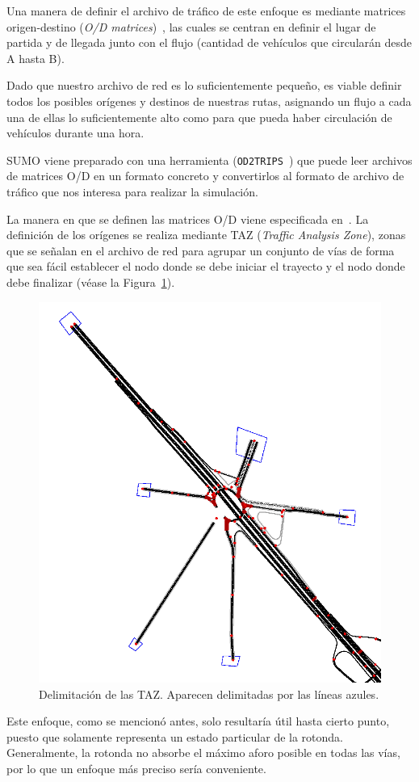 Una manera de definir el archivo de tráfico de este enfoque es mediante matrices origen-destino (\textit{O/D matrices})~\cite{otto_anker_nielsen_two_1998}, las cuales se centran en definir el lugar de partida y de llegada junto con el flujo (cantidad de vehículos que circularán desde A hasta B).

Dado que nuestro archivo de red es lo suficientemente pequeño, es viable definir todos los posibles orígenes y destinos de nuestras rutas, asignando un flujo a cada una de ellas lo suficientemente alto como para que pueda haber circulación de vehículos durante una hora.

SUMO viene preparado con una herramienta (\texttt{OD2TRIPS}~\cite{noauthor_od2trips_nodate}) que puede leer archivos de matrices O/D en un formato concreto y convertirlos al formato de archivo de tráfico que nos interesa para realizar la simulación.

La manera en que se definen las matrices O/D viene especificada en~\cite{noauthor_demandimporting_nodate}. La definición de los orígenes se realiza mediante TAZ (\textit{Traffic Analysis Zone}), zonas que se señalan en el archivo de red para agrupar un conjunto de vías de forma que sea fácil establecer el nodo donde se debe iniciar el trayecto y el nodo donde debe finalizar (véase la Figura~\ref{fig:taz}).

\begin{figure}[h]
    \centering
    \includegraphics[width=0.5\linewidth]{report/images/taz.png}
    \caption[Delimitación de las TAZ]{Delimitación de las TAZ. Aparecen delimitadas por las líneas azules.}
    \label{fig:taz}
\end{figure}

Este enfoque, como se mencionó antes, solo resultaría útil hasta cierto punto, puesto que solamente representa un estado particular de la rotonda. Generalmente, la rotonda no absorbe el máximo aforo posible en todas las vías, por lo que un enfoque más preciso sería conveniente.

